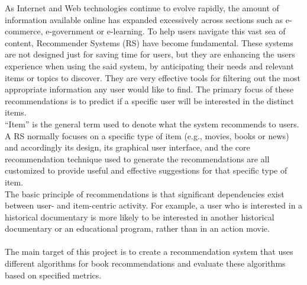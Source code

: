 \documentclass[\myFontSize,a4paper,oneside,english,hidelinks]{article}
\begin{document}
As Internet and Web technologies continue to evolve rapidly, the amount of information available online has expanded excessively across sections such as e-commerce, e-government or e-learning. To help users navigate this vast sea of content, Recommender Systems (RS) have become fundamental. These systems are not designed just for saving time for users, but they are enhancing the users experience when using the said system, by anticipating their needs and relevant items or topics to discover. They are very effective tools for filtering out the most appropriate information any user would like to find. The primary focus of these recommendations is to predict if a specific user will be interested in the distinct items.\\
%
“Item” is the general term used to denote what the system recommends to users. A RS normally focuses on a specific type of item (e.g., movies, books or news) and accordingly its design, its graphical user interface, and the core recommendation technique used to generate the recommendations are all customized to provide useful and effective suggestions for that specific type of item. \cite{pub.1036183961}\\
%
The basic principle of recommendations is that significant dependencies exist between user- and item-centric activity. 
For example, a user who is interested in a historical documentary is more likely to be interested in another historical documentary or an educational program, rather than in an action movie. \cite{pub.1022525812}\\\\
%
The main target of this project is to create a recommendation system that uses different algorithms for book recommendations and evaluate these algorithms based on specified metrics.\\





\clearpage{}
\end{document}
